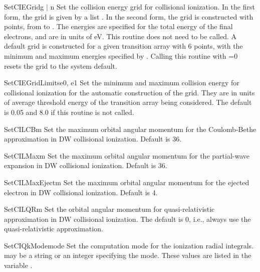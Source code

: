 \begin{fundesc}{SetCIEGrid}{g $\mid$ n}
Set the collision energy grid for collisional ionization. In the first form, the
grid is given by a list . In the second form, the grid is constructed
with  points, from  to . The energies are specified for
the total energy of the final electrons, and are in units of eV. This routine
does not need to be called. A default grid is constructed for a given transition
array with 6 points, with the minimum and maximum energies specified by
. Calling this routine with =0 resets the grid
to the system default.
\end{fundesc}

\begin{fundesc}{SetCIEGridLimits}{e0, e1}
Set the minimum and maximum collision energy for collisional ionization for
the automatic construction of the grid. They are in units of average threshold
energy of the transition array being considered. The default is 0.05 and 8.0
if this routine is not called.
\end{fundesc}

\begin{fundesc}{SetCILCB}{m}
Set the maximum orbital angular momentum for the Coulomb-Bethe approximation in
DW collisional ionization. Default is 36.
\end{fundesc}

\begin{fundesc}{SetCILMax}{m}
Set the maximum orbital angular momentum for the partial-wave expansion in DW
collisional ionization. Default is 36.
\end{fundesc}

\begin{fundesc}{SetCILMaxEject}{m}
Set the maximum orbital angular momentum for the ejected electron in DW
collisional ionization. Default is 4.
\end{fundesc}

\begin{fundesc}{SetCILQR}{m}
Set the orbital angular momentum for quasi-relativistic approximation in DW
collisional ionization. The default is 0, i.e., always use the
quasi-relativistic approximation.
\end{fundesc}

\begin{fundesc}{SetCIQkMode}{mode}
Set the computation mode for the ionization radial integrals.  may
be a string or an integer specifying the mode. These values are listed in the
variable .
\end{fundesc}

